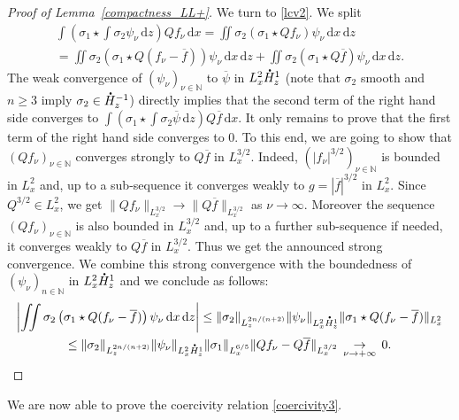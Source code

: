 \documentclass[JEP,XML,SOM,NoEqCountersInSection,NoFloatCountersInSection,Unicode,published]{cedram}
\let\bar\oldbar
\theoremstyle{definition}
\newcommand*{\overbigdot}[1]{%
\accentset{\mbox{\large\bfseries .}}{#1}}
\let\bar\overline
\newenvironment{ProofOf}[1]{\begin{proof}[Proof of #1]}{\end{proof}}
\newcommand{\ud}{\, {\mathrm{d}}}
\begin{document}
\begin{ProofOf}{Lemma~\ref{compactness_LL+}}
We turn to \eqref{lcv2}. We split
\begin{multline*}
\int\left(\sigma_{1}\star\int\sigma_{2}\psi_{\nu}\ud z\right)Qf_{\nu}\ud x=\iint\sigma_{2}\left(\sigma_{1}\star Qf_{\nu}\right)\psi_{\nu}\ud x\ud z\\
=\iint\sigma_{2}\left(\sigma_{1}\star Q(f_{\nu}-\bar{f})\right)\psi_{\nu}\ud x\ud z+\iint\sigma_{2}\left(\sigma_{1}\star Q\bar{f}\right)\psi_{\nu}\ud x\ud z.
\end{multline*}
The weak convergence of $(\psi_{\nu})_{\nu\in\mathbb N}$ to $\bar{\psi}$ in $L_{x}^{2}\overbigdot{H}_{z}^{1}$ (note that $\sigma_{2}$ smooth and $n\geq 3$ imply $\sigma_{2}\in\overbigdot{H}_{z}^{-1}$) directly implies that
the second term of the right hand side converges to $\int(\sigma_{1}\star\int\sigma_{2}\bar{\psi}\ud z)Q\bar{f}\ud x$.
It only remains to prove that the first term of the right hand side converges to $0$.
To this end, we are going to show
that $(Qf_{\nu})_{\nu\in\mathbb N}$ converges strongly to $Q\bar{f}$ in $L_{x}^{3/2}$. Indeed, $(|f_{\nu}|^{3/2})_{\nu\in\mathbb N}$ is bounded in $L_{x}^{2}$ and, up to a sub-sequence it converges weakly to $g=|\bar{f}|^{3/2}$ in $L_{x}^{2}$. Since $Q^{3/2}\in L_{x}^{2}$, we get $\|Qf_{\nu}\|_{L_{x}^{3/2}}\to\|Q\bar{f}\|_{L_{x}^{3/2}}$ as $\nu\to \infty$. Moreover the sequence $(Qf_{\nu})_{\nu\in\mathbb N}$ is also bounded in $L_{x}^{3/2}$ and, up to a further sub-sequence if needed, it converges weakly to $Q\bar{f}$ in $L_{x}^{3/2}$. Thus we get the announced strong convergence. We combine this strong convergence with the boundedness of $(\psi_{\nu})_{n\in \mathbb N}$ in $L_{x}^{2}\overbigdot{H}_{z}^{1}$ and we conclude as follows:
\bgroup
{}
\begin{multline*}
\left|\iint\sigma_{2}\left(\sigma_{1}\star Q(f_{\nu}-\bar{f})\right)\psi_{\nu}\ud x\ud z\right|\leq\|\sigma_{2}\|_{L_{z}^{2n/(n+2)}}\|\psi_{\nu}\|_{L_{x}^{2}\overbigdot{H}_{z}^{1}}\|\sigma_{1}\star Q(f_{\nu}-\bar{f})\|_{L_{x}^{2}}\\
\leq\|\sigma_{2}\|_{L_{z}^{2n/(n+2)}}\|\psi_{\nu}\|_{L_{x}^{2}\overbigdot{H}_{z}^{1}}\|\sigma_{1}\|_{L_{x}^{6/5}}\|Qf_{\nu}-Q\bar{f}\|_{L_{x}^{3/2}}\,\underset{\nu\to+\infty}{\to}\,0.\qedhere
\end{multline*}\egroup
\end{ProofOf}

We are now able to prove the coercivity relation \eqref{coercivity3}.
\end{document}
